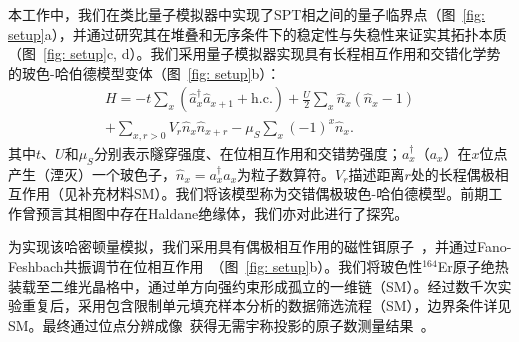 \documentclass[preprint,superscriptaddress,floatfix,nofootinbib]{revtex4-2}
\begin{document}
本工作中，我们在类比量子模拟器中实现了SPT相之间的量子临界点（图~\ref{fig: setup}a），并通过研究其在堆叠和无序条件下的稳定性与失稳性来证实其拓扑本质（图~\ref{fig: setup}c, d）。我们采用量子模拟器\cite{Bloch2008, Gross2017, Bohrdt2021}实现具有长程相互作用和交错化学势的玻色-哈伯德模型变体（图~\ref{fig: setup}b）：
\begin{equation}
\label{eq: Hamiltonian}
\begin{split}
H=-t\sum_{x}(\hat{a}_x^\dag \hat{a}_{x + 1}+\mathrm{h.c.})+\frac{U}{2}\sum_x\hat{n}_x(\hat{n}_x-1) \\
+\sum_{x, r>0}V_{r}\hat{n}_x\hat{n}_{x + r} - \mu_S\sum_x(-1)^x\hat{n}_x.
\end{split}
\end{equation}
其中$t$、$U$和$\mu_S$分别表示隧穿强度、在位相互作用和交错势强度；$a_x^{\dagger}$（$a_x$）在$x$位点产生（湮灭）一个玻色子，$\hat{n}_x = a_x^{\dagger} a_x$为粒子数算符。$V_r$描述距离$r$处的长程偶极相互作用（见补充材料SM）。我们将该模型称为交错偶极玻色-哈伯德模型。前期工作\cite{Torre2006,Berg2008}曾预言其相图中存在Haldane绝缘体\cite{Haldane1983}，我们亦对此进行了探究。

为实现该哈密顿量模拟，我们采用具有偶极相互作用的磁性铒原子~\cite{Su2023}，并通过Fano-Feshbach共振调节在位相互作用~\cite{Chin2010}（图~\ref{fig: setup}b）。我们将玻色性$^{164}$Er原子绝热装载至二维光晶格中，通过单方向强约束形成孤立的一维链（SM）。经过数千次实验重复后，采用包含限制单元填充样本分析的数据筛选流程（SM），边界条件详见SM。最终通过位点分辨成像~\cite{Bakr2010, Sherson2010}获得无需宇称投影的原子数测量结果~\cite{Su2024}。
\end{document}
